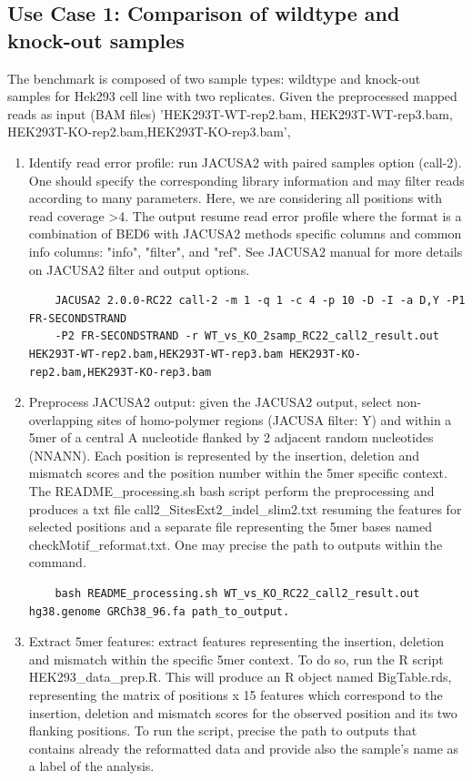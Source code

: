 \documentclass[times, 11pt, a4paper]{article}
\begin{document}
\subsection*{Use Case 1: Comparison of wildtype and knock-out samples}
The benchmark is composed of two sample types: wildtype and knock-out samples for Hek293 cell line with two replicates. 
Given the preprocessed mapped reads as input (BAM files) 'HEK293T-WT-rep2.bam, HEK293T-WT-rep3.bam, HEK293T-KO-rep2.bam,HEK293T-KO-rep3.bam',
\begin{enumerate} 
	\item Identify read error profile: run JACUSA2 with paired samples option (call-2). One should specify the corresponding library information and may filter reads according to many parameters. Here, we are considering all positions with read coverage >4. The output resume read error profile where the format is a combination of BED6 with JACUSA2 methods specific columns and common info columns: "info", "filter", and "ref". See JACUSA2 manual for more details on JACUSA2 filter and output options.
	\begin{verbatim}
	JACUSA2 2.0.0-RC22 call-2 -m 1 -q 1 -c 4 -p 10 -D -I -a D,Y -P1 FR-SECONDSTRAND
	-P2 FR-SECONDSTRAND -r WT_vs_KO_2samp_RC22_call2_result.out HEK293T-WT-rep2.bam,HEK293T-WT-rep3.bam	HEK293T-KO-rep2.bam,HEK293T-KO-rep3.bam
	\end{verbatim}
	\item Preprocess JACUSA2 output: given the JACUSA2 output, select non-overlapping sites of homo-polymer regions (JACUSA filter: Y) and within a 5mer of a central A nucleotide flanked by 2 adjacent random nucleotides (NNANN). Each position is represented by the insertion, deletion and mismatch scores and the position number within the 5mer specific context. The README\_processing.sh bash script perform the preprocessing and produces a txt file call2\_SitesExt2\_indel\_slim2.txt resuming the features for selected positions and a separate file representing the 5mer bases named checkMotif\_reformat.txt. One may precise the path to outputs within the command.
	\begin{verbatim} 
	bash README_processing.sh WT_vs_KO_RC22_call2_result.out hg38.genome GRCh38_96.fa path_to_output.
	\end{verbatim}
	\item Extract 5mer features: extract features representing the insertion, deletion and mismatch within the specific 5mer context. To do so, run the R script HEK293\_data\_prep.R. This will produce an R object named BigTable.rds, representing the matrix of positions x 15 features which correspond to the insertion, deletion and mismatch scores for the observed position and its two flanking positions. To run the script, precise the path to outputs that contains already the reformatted data and provide also the sample's name as a label of the analysis.

\end{enumerate}
\end{document}
